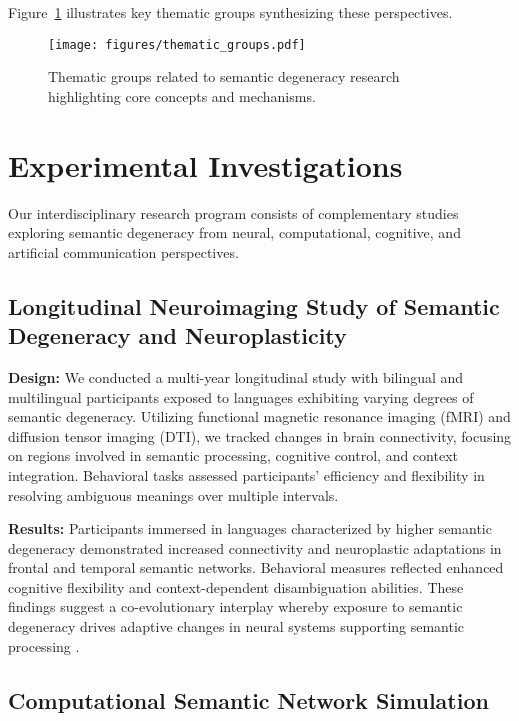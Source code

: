 \documentclass[12pt,a4paper]{article}
\begin{document}
Figure~\ref{fig:thematic_groups} illustrates key thematic groups synthesizing these perspectives.

\begin{figure}[h!]
    \centering
    \texttt{[image: figures/thematic\_groups.pdf]}
    \caption{Thematic groups related to semantic degeneracy research highlighting core concepts and mechanisms.}
    \label{fig:thematic_groups}
\end{figure}

\section{Experimental Investigations}

Our interdisciplinary research program consists of complementary studies exploring semantic degeneracy from neural, computational, cognitive, and artificial communication perspectives.

\subsection{Longitudinal Neuroimaging Study of Semantic Degeneracy and Neuroplasticity}

\textbf{Design:} We conducted a multi-year longitudinal study with bilingual and multilingual participants exposed to languages exhibiting varying degrees of semantic degeneracy. Utilizing functional magnetic resonance imaging (fMRI) and diffusion tensor imaging (DTI), we tracked changes in brain connectivity, focusing on regions involved in semantic processing, cognitive control, and context integration. Behavioral tasks assessed participants' efficiency and flexibility in resolving ambiguous meanings over multiple intervals.

\textbf{Results:} Participants immersed in languages characterized by higher semantic degeneracy demonstrated increased connectivity and neuroplastic adaptations in frontal and temporal semantic networks. Behavioral measures reflected enhanced cognitive flexibility and context-dependent disambiguation abilities. These findings suggest a co-evolutionary interplay whereby exposure to semantic degeneracy drives adaptive changes in neural systems supporting semantic processing \cite{citation_needed}.

\subsection{Computational Semantic Network Simulation}
\end{document}
